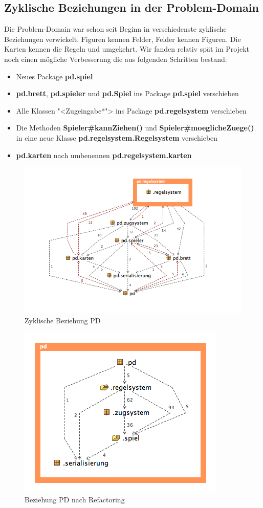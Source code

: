 \documentclass[12pt,halfparskip]{scrartcl}
\begin{document}
\subsection{Zyklische Beziehungen in der Problem-Domain}
Die Problem-Domain war schon seit Beginn in verschiedenste zyklische Beziehungen verwickelt. Figuren kennen Felder, Felder kennen Figuren. Die Karten kennen die Regeln und umgekehrt. Wir fanden relativ spät im Projekt noch einen mögliche Verbesserung die aus folgenden Schritten bestand:

\begin{itemize}
	\item Neues Package \textbf{pd.spiel}
	\item \textbf{pd.brett}, \textbf{pd.spieler} und \textbf{pd.Spiel} ins Package \textbf{pd.spiel} verschieben
	\item Alle Klassen "<Zugeingabe*">  ins Package \textbf{pd.regelsystem} verschieben
	\item Die Methoden \textbf{Spieler\#kannZiehen()} und \textbf{Spieler\#moeglicheZuege()} in eine neue Klasse \textbf{pd.regelsystem.Regelsystem} verschieben
	\item \textbf{pd.karten} nach umbenennen \textbf{pd.regelsystem.karten}
\end{itemize}


\begin{figure}[H]
	\centering
	\includegraphics[width=0.8 \textwidth]{../design/probleme/package-level-vorher}
	\caption{Zyklische Beziehung PD}
\end{figure}

\begin{figure}[H]
	\centering
	\includegraphics[width=0.5 \textwidth]{../design/probleme/package-level-nachher}
	\caption{Beziehung PD nach Refactoring}
\end{figure}
\end{document}
